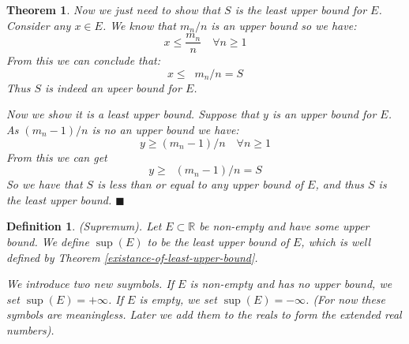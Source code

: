 \documentclass{article}
\newtheorem{definition}{Definition}[subsection]
\newtheorem{theorem}{Theorem}[subsection]
\newcommand{\R}{\mathbb{R}}
\DeclareMathOperator{\infLIM}{\mathrm{LIM}_{n \to \infty}}
\begin{document}
\begin{theorem}
	Now we just need to show that $S$ is the least upper bound 
	for $E$. Consider any $x \in E$. We know 
	that $m_n/n$ is an upper bound so we have: 
	$$
	x \leq \frac{m_n}{n} \quad \forall n \geq 1
	$$
	From this we can conclude that:
	$$
	x \leq \infLIM m_n/n = S
	$$
	Thus $S$ is indeed an upeer bound for $E$. 

	Now we show it is a least upper bound. Suppose
	that $y$ is an upper bound for $E$. 
	As $(m_n - 1)/n$ is no an upper bound we have:
	$$
	y \geq (m_n - 1)/n \quad \forall n \geq 1
	$$
	From this we can get
	$$
	y \geq \infLIM (m_n - 1)/n = S
	$$
	So we have that $S$ is less than or equal 
	to any upper bound of $E$, and thus $S$ 
	is the least upper bound. \hfill $\blacksquare$
\end{theorem}

\begin{definition}
\label{supremum-standard}
	(Supremum). Let $E \subset \R$ be non-empty 
	and have some upper bound. We define 
	$\sup(E)$ to be the least upper bound 
	of $E$, which is well defined by
	Theorem \ref{existance-of-least-upper-bound}.

	We introduce two new suymbols. If $E$ is 
	non-empty and has no upper bound, we 
	set $\sup(E) = +\infty$. If $E$ is 
	empty, we set $\sup(E) = -\infty$.
	(For now these symbols are meaningless. 
	Later we add them to the reals to form 
	the extended real numbers).
\end{definition}
\end{document}
